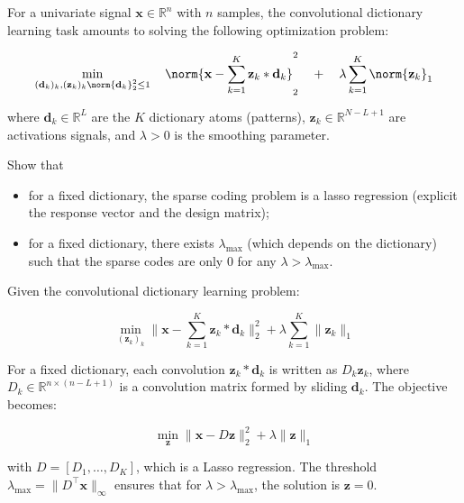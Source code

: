 \documentclass[11pt]{article}
\begin{document}
\begin{exercise}
For a univariate signal $\mathbf{x}\in\mathbb{R}^n$ with $n$ samples, the convolutional dictionary learning task amounts to solving the following optimization problem:

\begin{equation}
\min_{(\mathbf{d}_k)_k, (\mathbf{z}_k)_k \\ \norm{\mathbf{d}_k}_2^2\leq 1} \quad\norm{\mathbf{x} - \sum_{k=1}^K \mathbf{z}_k * \mathbf{d}_k }^2_2 \quad + \quad\lambda \sum_{k=1}^K \norm{\mathbf{z}_k}_1
\end{equation}

where $\mathbf{d}_k\in\mathbb{R}^L$ are the $K$ dictionary atoms (patterns), $\mathbf{z}_k\in\mathbb{R}^{N-L+1}$ are activations signals, and $\lambda>0$ is the smoothing parameter.

Show that
\begin{itemize}
    \item for a fixed dictionary, the sparse coding problem is a lasso regression (explicit the response vector and the design matrix);
    \item for a fixed dictionary, there exists $\lambda_{\max}$ (which depends on the dictionary) such that the sparse codes are only 0 for any $\lambda > \lambda_{\max}$. 
\end{itemize}
\end{exercise}

\begin{solution}  %

Given the convolutional dictionary learning problem:

\[
\min_{(\mathbf{z}_k)_k} \|\mathbf{x} - \sum_{k=1}^K \mathbf{z}_k * \mathbf{d}_k\|_2^2 + \lambda \sum_{k=1}^K \|\mathbf{z}_k\|_1
\]

For a fixed dictionary, each convolution \(\mathbf{z}_k * \mathbf{d}_k\) is written as \(D_k \mathbf{z}_k\), where \(D_k \in \mathbb{R}^{n \times (n-L+1)}\) is a convolution matrix formed by sliding \(\mathbf{d}_k\). The objective becomes:

\[
\min_{\mathbf{z}} \|\mathbf{x} - D \mathbf{z}\|_2^2 + \lambda \|\mathbf{z}\|_1
\]

with \(D = [D_1, \dots, D_K]\), which is a Lasso regression. The threshold \(\lambda_{\max} = \|D^\top \mathbf{x}\|_\infty\) ensures that for \(\lambda > \lambda_{\max}\), the solution is \(\mathbf{z} = 0\).

\end{solution} %
\end{document}
